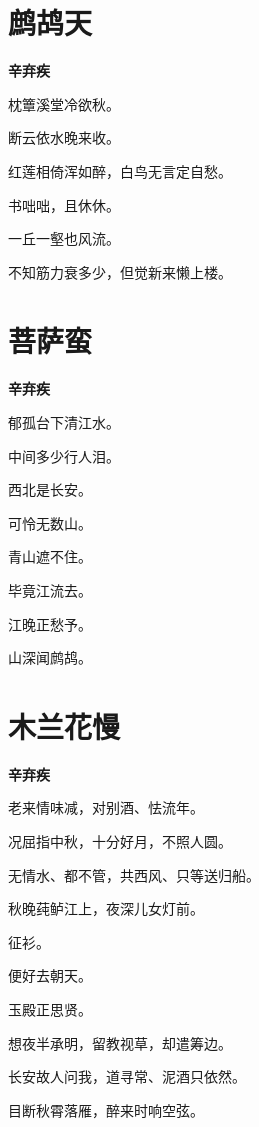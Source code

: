 \documentclass[12pt,a4paper]{ctexbook}
\begin{document}
\section{鹧鸪天}
\textbf{辛弃疾}\par\vspace{0.5em}
枕簟溪堂冷欲秋。\par
断云依水晚来收。\par
红莲相倚浑如醉，白鸟无言定自愁。\par
书咄咄，且休休。\par
一丘一壑也风流。\par
不知筋力衰多少，但觉新来懒上楼。\par

\section{菩萨蛮}
\textbf{辛弃疾}\par\vspace{0.5em}
郁孤台下清江水。\par
中间多少行人泪。\par
西北是长安。\par
可怜无数山。\par
青山遮不住。\par
毕竟江流去。\par
江晚正愁予。\par
山深闻鹧鸪。\par

\section{木兰花慢}
\textbf{辛弃疾}\par\vspace{0.5em}
老来情味减，对别酒、怯流年。\par
况屈指中秋，十分好月，不照人圆。\par
无情水、都不管，共西风、只等送归船。\par
秋晚莼鲈江上，夜深儿女灯前。\par
征衫。\par
便好去朝天。\par
玉殿正思贤。\par
想夜半承明，留教视草，却遣筹边。\par
长安故人问我，道寻常、泥酒只依然。\par
目断秋霄落雁，醉来时响空弦。\par
\end{document}
